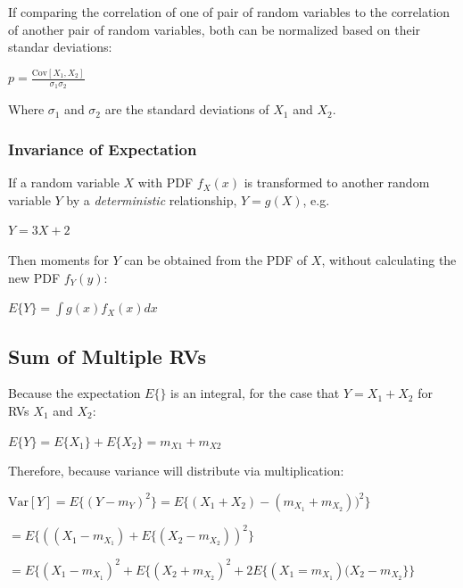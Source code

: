 \documentclass[11pt]{article}
\begin{document}
If comparing the correlation of one of pair of random variables to the correlation of another pair of random variables, both can be normalized based on their standar deviations: \\ 

\begin{center}
    $p = \frac{\text{Cov}[X_1,X_2]}{\sigma_1\sigma_2}$
\end{center}

Where $\sigma_1$ and $\sigma_2$ are the standard deviations of $X_1$ and $X_2$.

\subsubsection{Invariance of Expectation}

If a random variable $X$ with PDF $f_X(x)$ is transformed to another random variable $Y$ by a \textit{deterministic} relationship, $Y = g(X)$, e.g. \\ 

\begin{center}
    $Y = 3X +2$
\end{center}

Then moments for $Y$ can be obtained from the PDF of $X$, without calculating the new PDF $f_Y(y)$:

\begin{center}
    $E\{Y\} = \int g(x)f_X(x)dx$
\end{center}

\subsection{Sum of Multiple RVs}

Because the expectation $E\{\}$ is an integral, for the case that $Y = X_1 + X_2$ for RVs $X_1$ and $X_2$:
\begin{center}
    $E\{Y\} = E\{X_1\} + E\{X_2\} = m_{X1} + m_{X2}$
\end{center}

Therefore, because variance will distribute via multiplication:
\begin{center}
    $\text{Var}[Y] = E\{(Y-m_Y)^2\} = E\{(X_1 + X_2) - (m_{X_1} + m_{X_2}))^2\}$
\end{center}

\begin{center}
    $ = E\{((X_1 - m_{X_1}) + E\{(X_2 - m_{X_2}))^2\}$
\end{center}

\begin{center}
    $ = E\{(X_1 - m_{X_1})^2 + E\{(X_2 + m_{X_2})^2 + 2E\{(X_1 = m_{X_1})(X_2 - m_{X_2}\}\}$
\end{center}
\end{document}
